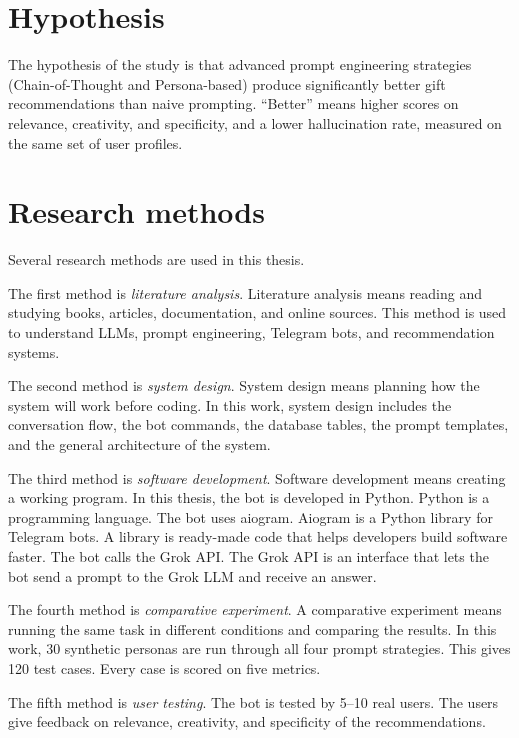\section*{Hypothesis}

The hypothesis of the study is that advanced prompt engineering strategies (Chain-of-Thought and Persona-based) produce significantly better gift recommendations than naive prompting. ``Better'' means higher scores on relevance, creativity, and specificity, and a lower hallucination rate, measured on the same set of user profiles.

\section*{Research methods}

Several research methods are used in this thesis.

The first method is \textit{literature analysis}. Literature analysis means reading and studying books, articles, documentation, and online sources. This method is used to understand LLMs, prompt engineering, Telegram bots, and recommendation systems.

The second method is \textit{system design}. System design means planning how the system will work before coding. In this work, system design includes the conversation flow, the bot commands, the database tables, the prompt templates, and the general architecture of the system.

The third method is \textit{software development}. Software development means creating a working program. In this thesis, the bot is developed in Python. Python is a programming language. The bot uses aiogram. Aiogram is a Python library for Telegram bots. A library is ready-made code that helps developers build software faster. The bot calls the Grok API. The Grok API is an interface that lets the bot send a prompt to the Grok LLM and receive an answer.

The fourth method is \textit{comparative experiment}. A comparative experiment means running the same task in different conditions and comparing the results. In this work, 30 synthetic personas are run through all four prompt strategies. This gives 120 test cases. Every case is scored on five metrics.

The fifth method is \textit{user testing}. The bot is tested by 5--10 real users. The users give feedback on relevance, creativity, and specificity of the recommendations.

